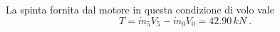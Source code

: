 %
La spinta fornita dal motore in questa condizione di volo vale
\begin{equation}
 T = \dot{m}_5 V_5 - \dot{m}_0 V_0 = 42.90 \, kN \ .
\end{equation}













